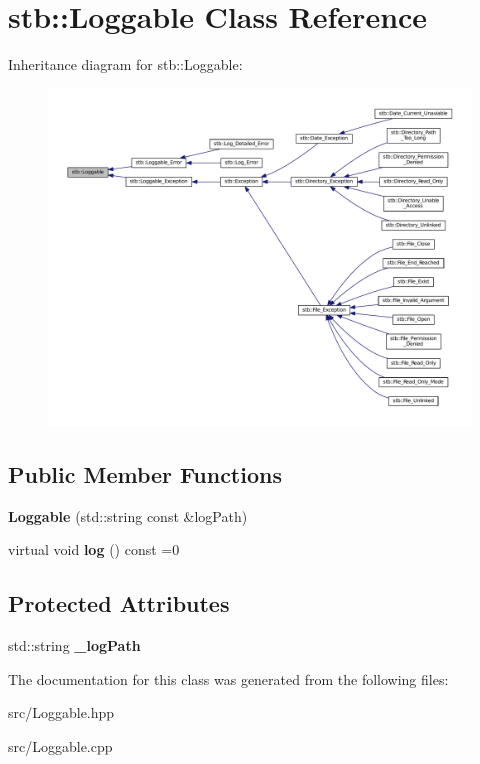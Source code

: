 \hypertarget{classstb_1_1Loggable}{\section{stb\+:\+:Loggable Class Reference}
\label{classstb_1_1Loggable}
}


Inheritance diagram for stb\+:\+:Loggable\+:
\nopagebreak
\begin{figure}[H]
\begin{center}
\leavevmode
\includegraphics[width=350pt]{classstb_1_1Loggable__inherit__graph}
\end{center}
\end{figure}
\subsection*{Public Member Functions}
\begin{DoxyCompactItemize}
\item 
\hypertarget{classstb_1_1Loggable_a5f88b515da0c8fbe462fc7322cc0aca7}{{\bfseries Loggable} (std\+::string const \&log\+Path)}\label{classstb_1_1Loggable_a5f88b515da0c8fbe462fc7322cc0aca7}

\item 
\hypertarget{classstb_1_1Loggable_a5b23f9a17be15e5343309728ac3fee32}{virtual void {\bfseries log} () const =0}\label{classstb_1_1Loggable_a5b23f9a17be15e5343309728ac3fee32}

\end{DoxyCompactItemize}
\subsection*{Protected Attributes}
\begin{DoxyCompactItemize}
\item 
\hypertarget{classstb_1_1Loggable_a6ff522e1254f9e08406b20713a905a25}{std\+::string {\bfseries \+\_\+log\+Path}}\label{classstb_1_1Loggable_a6ff522e1254f9e08406b20713a905a25}

\end{DoxyCompactItemize}


The documentation for this class was generated from the following files\+:\begin{DoxyCompactItemize}
\item 
src/Loggable.\+hpp\item 
src/Loggable.\+cpp\end{DoxyCompactItemize}
